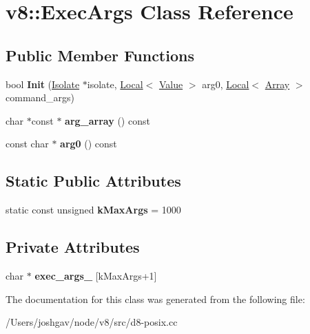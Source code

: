 \hypertarget{classv8_1_1_exec_args}{}\section{v8\+:\+:Exec\+Args Class Reference}
\label{classv8_1_1_exec_args}
\subsection*{Public Member Functions}
\begin{DoxyCompactItemize}
\item 
bool {\bfseries Init} (\hyperlink{classv8_1_1_isolate}{Isolate} $\ast$isolate, \hyperlink{classv8_1_1_local}{Local}$<$ \hyperlink{classv8_1_1_value}{Value} $>$ arg0, \hyperlink{classv8_1_1_local}{Local}$<$ \hyperlink{classv8_1_1_array}{Array} $>$ command\+\_\+args)\hypertarget{classv8_1_1_exec_args_a0a3d2c5c83746343e23c35d0ac3c4b45}{}\label{classv8_1_1_exec_args_a0a3d2c5c83746343e23c35d0ac3c4b45}

\item 
char $\ast$const $\ast$ {\bfseries arg\+\_\+array} () const \hypertarget{classv8_1_1_exec_args_ac1f9ee5843647f471b7c6c889b30c55c}{}\label{classv8_1_1_exec_args_ac1f9ee5843647f471b7c6c889b30c55c}

\item 
const char $\ast$ {\bfseries arg0} () const \hypertarget{classv8_1_1_exec_args_ab9048917a6d14f4e9f7327f2a257d973}{}\label{classv8_1_1_exec_args_ab9048917a6d14f4e9f7327f2a257d973}

\end{DoxyCompactItemize}
\subsection*{Static Public Attributes}
\begin{DoxyCompactItemize}
\item 
static const unsigned {\bfseries k\+Max\+Args} = 1000\hypertarget{classv8_1_1_exec_args_acef444e061c4104eb8810fd0d5ae366d}{}\label{classv8_1_1_exec_args_acef444e061c4104eb8810fd0d5ae366d}

\end{DoxyCompactItemize}
\subsection*{Private Attributes}
\begin{DoxyCompactItemize}
\item 
char $\ast$ {\bfseries exec\+\_\+args\+\_\+} \mbox{[}k\+Max\+Args+1\mbox{]}\hypertarget{classv8_1_1_exec_args_a64242faf5bf6c1dea7d91a09f6884dd2}{}\label{classv8_1_1_exec_args_a64242faf5bf6c1dea7d91a09f6884dd2}

\end{DoxyCompactItemize}


The documentation for this class was generated from the following file\+:\begin{DoxyCompactItemize}
\item 
/\+Users/joshgav/node/v8/src/d8-\/posix.\+cc\end{DoxyCompactItemize}
